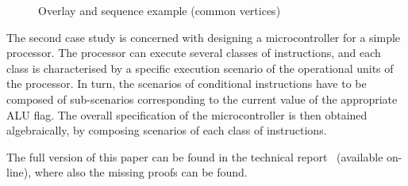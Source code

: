 \begin{figure}
\begin{centering}
{}\hfill{}\hfill{}\hfill{}
\par\end{centering}

\caption{Overlay and sequence example (common vertices)\label{fig:Overlay-and-sequence}}
\end{figure}


The second case study is concerned with designing a microcontroller
for a simple processor. The processor can execute several classes
of instructions, and each class is characterised by a specific execution
scenario of the operational units of the processor. In turn, the scenarios
of conditional instructions have to be composed of sub-scenarios corresponding
to the current value of the appropriate ALU flag. The overall specification
of the microcontroller is then obtained algebraically, by composing
scenarios of each class of instructions.

The full version of this paper can be found in the technical report~\cite{2011_mokhov_pg}
(available on-line), where also the missing proofs can be found.

